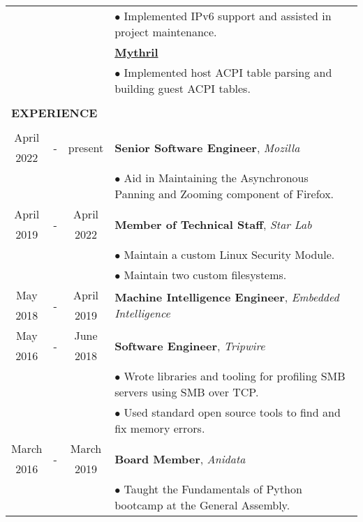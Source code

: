 \documentclass[10pt]{article}
\begin{document}
\begin{table}[ht]
\begin{tabular}{@{\hspace{0mm}}c@{\hspace{1mm}}c@{\hspace{3mm}}cl}
            & & & $\bullet$ Implemented IPv6 support and assisted in project maintenance.\\[2mm]
            & & & \textbf{\href{https://github.com/mythril-hypervisor/mythril}{Mythril}}\\
            & & & $\bullet$ Implemented host ACPI table parsing and building guest ACPI tables.\\[2mm]
            \hline\\[-3mm]
            \multicolumn{4}{l}{\large{\textbf{EXPERIENCE}}}\\
            \hline\\[-2mm]
            April & \multirow{2}{*}{-} & \multirow{2}{*}{present} & \multirow{2}{*}{\textbf{Senior Software Engineer}, \textit{Mozilla}}\\
            2022 & & &\\
            & & & $\bullet$ Aid in Maintaining the Asynchronous Panning and Zooming component of Firefox.\\
            April & \multirow{2}{*}{-} & April & \multirow{2}{*}{\textbf{Member of Technical Staff}, \textit{Star Lab}}\\
            2019 & & 2022 &\\
            & & & $\bullet$ Maintain a custom Linux Security Module.\\
            & & & $\bullet$ Maintain two custom filesystems.\\
            May & \multirow{2}{*}{-} & April & \multirow{2}{*}{\textbf{Machine Intelligence Engineer}, \textit{Embedded Intelligence}}\\
            2018 & & 2019 &\\
            May & \multirow{2}{*}{-} & June & \multirow{2}{*}{\textbf{Software Engineer}, \textit{Tripwire}}\\
            2016 & & 2018 &\\
            & & & $\bullet$ Wrote libraries and tooling for profiling SMB servers using SMB over TCP.\\
            & & & $\bullet$ Used standard open source tools to find and fix memory errors.\\
            March & \multirow{2}{*}{-} & March & \multirow{2}{*}{\textbf{Board Member}, \textit{Anidata}}\\
            2016 & & 2019 &\\
            & & & $\bullet$ Taught the Fundamentals of Python bootcamp at the General Assembly.\\

\end{tabular}
\end{table}
\end{document}
